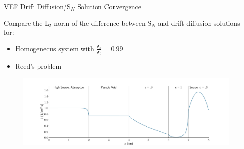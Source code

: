 \documentclass[10pt]{beamer}
\newcommand{\SN}{S$_N$\xspace}
\begin{document}
\begin{frame}{VEF Drift Diffusion/\SN Solution Convergence}

	Compare the L$_2$ norm of the difference between \SN and drift diffusion solutions for:
	\begin{itemize} 

		\item Homogeneous system with $\frac{\sigma_s}{\sigma_t} = 0.99$ 

		\item Reed's problem 

	\end{itemize}

	\begin{figure}
		\centering
		\includegraphics[width=\textwidth]{figs/reed_solution.pdf}
	\end{figure}

\end{frame}
\end{document}
